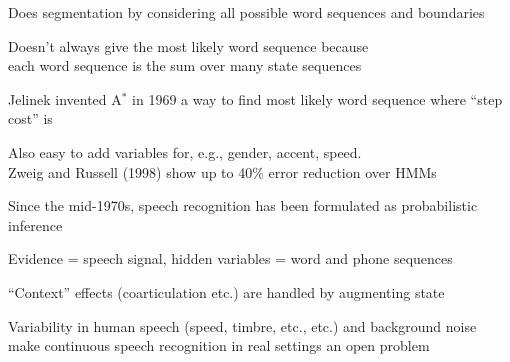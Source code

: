 \documentclass{article}
\begin{document}
\begin{huge}
Does segmentation by considering all possible word sequences and boundaries

Doesn't always give the most likely word sequence because\\
each word sequence is the sum over many state sequences

Jelinek invented A$^*$ in 1969 a way to find most likely word sequence\al
   where ``step cost'' is 






\vspace{0.5in}

\textwidth
{}

Also easy to add variables for, e.g., gender, accent, speed.\\
Zweig and Russell (1998) show up to 40\% error reduction over HMMs


Since the mid-1970s, speech recognition has been formulated as probabilistic inference

Evidence = speech signal, hidden variables = word and phone sequences

``Context'' effects (coarticulation etc.) are handled by augmenting state

Variability in human speech (speed, timbre, etc., etc.) and background noise\\
make continuous speech recognition in real settings an open problem
  



\end{huge} 
\end{document}
